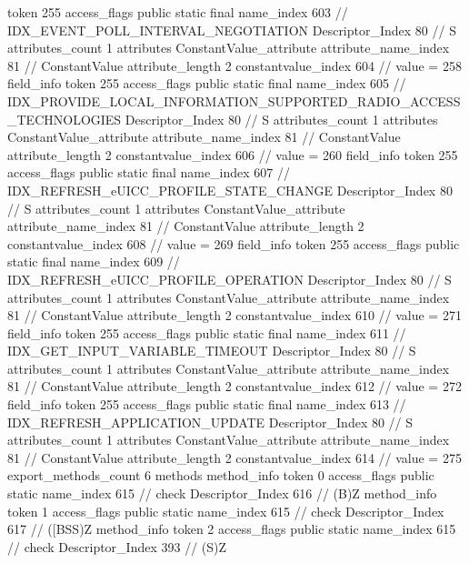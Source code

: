 {{{{{				token	255
				access_flags	public static final
				name_index	603		// IDX_EVENT_POLL_INTERVAL_NEGOTIATION
				Descriptor_Index	80		// S
				attributes_count	1
				attributes {
				ConstantValue_attribute {
					attribute_name_index	81		// ConstantValue
					attribute_length	2
					constantvalue_index	604		// value = 258
				}
				}
			}
			field_info {
				token	255
				access_flags	public static final
				name_index	605		// IDX_PROVIDE_LOCAL_INFORMATION_SUPPORTED_RADIO_ACCESS_TECHNOLOGIES
				Descriptor_Index	80		// S
				attributes_count	1
				attributes {
				ConstantValue_attribute {
					attribute_name_index	81		// ConstantValue
					attribute_length	2
					constantvalue_index	606		// value = 260
				}
				}
			}
			field_info {
				token	255
				access_flags	public static final
				name_index	607		// IDX_REFRESH_eUICC_PROFILE_STATE_CHANGE
				Descriptor_Index	80		// S
				attributes_count	1
				attributes {
				ConstantValue_attribute {
					attribute_name_index	81		// ConstantValue
					attribute_length	2
					constantvalue_index	608		// value = 269
				}
				}
			}
			field_info {
				token	255
				access_flags	public static final
				name_index	609		// IDX_REFRESH_eUICC_PROFILE_OPERATION
				Descriptor_Index	80		// S
				attributes_count	1
				attributes {
				ConstantValue_attribute {
					attribute_name_index	81		// ConstantValue
					attribute_length	2
					constantvalue_index	610		// value = 271
				}
				}
			}
			field_info {
				token	255
				access_flags	public static final
				name_index	611		// IDX_GET_INPUT_VARIABLE_TIMEOUT
				Descriptor_Index	80		// S
				attributes_count	1
				attributes {
				ConstantValue_attribute {
					attribute_name_index	81		// ConstantValue
					attribute_length	2
					constantvalue_index	612		// value = 272
				}
				}
			}
			field_info {
				token	255
				access_flags	public static final
				name_index	613		// IDX_REFRESH_APPLICATION_UPDATE
				Descriptor_Index	80		// S
				attributes_count	1
				attributes {
				ConstantValue_attribute {
					attribute_name_index	81		// ConstantValue
					attribute_length	2
					constantvalue_index	614		// value = 275
				}
				}
			}
			}
			export_methods_count	6
			methods {
				method_info {
					token	0
					access_flags	public static
					name_index	615		// check
					Descriptor_Index	616		// (B)Z
				}
				method_info {
					token	1
					access_flags	public static
					name_index	615		// check
					Descriptor_Index	617		// ([BSS)Z
				}
				method_info {
					token	2
					access_flags	public static
					name_index	615		// check
					Descriptor_Index	393		// (S)Z
}}}}}
